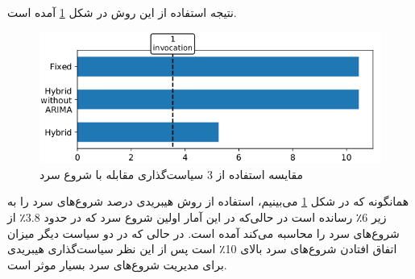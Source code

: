 نتیجه استفاده از این روش در شکل \ref{fig:Azure-Hybrid-Arima-Usage-Result} آمده است. 

\begin{figure}
	\centering
	\includegraphics[width=0.7\linewidth]{figs/Azure-Hybrid-Arima-Usage-Result}
	\caption {مقایسه استفاده از 3 سیاست‌گذاری  مقابله با شروع سرد}
	\label{fig:Azure-Hybrid-Arima-Usage-Result}
\end{figure}

همانگونه که در شکل \ref{fig:Azure-Hybrid-Arima-Usage-Result} می‌بینیم، استفاده از روش هیبریدی درصد شروع‌های سرد را به زیر 6٪ رسانده است در حالی‌که در این آمار اولین شروع سرد که در حدود 3.8٪ از شروع‌های سرد را محاسبه می‌کند آمده است. در حالی که در دو سیاست دیگر میزان اتفاق افتادن شروع‌های سرد بالای 10٪ است پس از این نظر سیاست‌گذاری هیبریدی برای مدیریت شروع‌های سرد بسیار موثر است. 